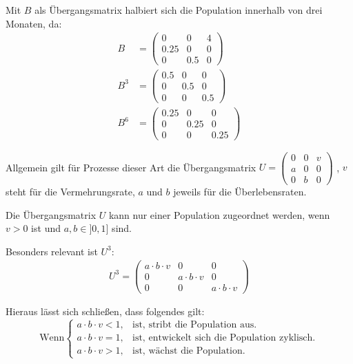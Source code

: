 \begin{flushleft}
Mit $B$ als Übergangsmatrix halbiert sich die Population innerhalb von drei Monaten,
da:
\begin{align}
    B&=\begin{pmatrix}
        0    & 0   & 4 \\
        0.25 & 0   & 0 \\
        0    & 0.5 & 0
    \end{pmatrix} \\
    B^3&=\begin{pmatrix}
        0.5 & 0   & 0 \\
        0   & 0.5 & 0 \\
        0   & 0   & 0.5
    \end{pmatrix} \\
    B^6&=\begin{pmatrix}
        0.25 & 0   & 0 \\
        0    & 0.25 & 0 \\
        0    & 0    & 0.25
    \end{pmatrix}
\end{align}

Allgemein gilt für Prozesse dieser Art die Übergangsmatrix 
$
U=\begin{pmatrix}
    0 & 0 & v \\
    a & 0 & 0 \\
    0 & b & 0
\end{pmatrix}
$
, $v$ steht für die Vermehrungsrate, $a$ und $b$ jeweils für die Überlebensraten.

Die Übergangsmatrix $U$ kann nur einer Population zugeordnet werden, wenn $v>0$ ist und $a,b\in]0,1]$ sind.

Besonders relevant ist $U^3$:
\begin{align}   
    U^3=\begin{pmatrix}
        a\cdot b\cdot v & 0 & 0 \\
        0 & a\cdot b\cdot v & 0 \\
        0 & 0 & a\cdot b\cdot v
    \end{pmatrix}
\end{align}

Hieraus lässt sich schließen, dass folgendes gilt:
\[
    \text{Wenn}
\begin{cases}
    a\cdot b\cdot v < 1,& \text{ist, stribt die Population aus.} \\
    a\cdot b\cdot v = 1,& \text{ist, entwickelt sich die Population zyklisch.} \\
    a\cdot b\cdot v > 1,& \text{ist, wächst die Population.}
\end{cases}
\]


\end{flushleft}
